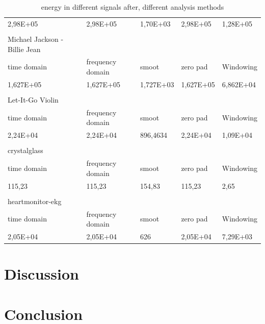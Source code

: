 \begin{table}[]
\begin{tabularx}{\textwidth}{Xllll}
		2,98E+05                      & 2,98E+05         & 1,70E+03  & 2,98E+05  & 1,28E+05  \\
		                              &                  &           &           &           \\
		Michael Jackson - Billie Jean &                  &           &           &           \\
		time domain                   & frequency domain & smoot     & zero pad  & Windowing \\
		1,627E+05                     & 1,627E+05        & 1,727E+03 & 1,627E+05 & 6,862E+04 \\
		                              &                  &           &           &           \\
		Let-It-Go Violin              &                  &           &           &           \\
		time domain                   & frequency domain & smoot     & zero pad  & Windowing \\
		2,24E+04                      & 2,24E+04         & 896,4634  & 2,24E+04  & 1,09E+04  \\
		                              &                  &           &           &           \\
		crystalglass                  &                  &           &           &           \\
		time domain                   & frequency domain & smoot     & zero pad  & Windowing \\
		115,23                        & 115,23           & 154,83    & 115,23    & 2,65      \\
		                              &                  &           &           &           \\
		heartmonitor-ekg              &                  &           &           &           \\
		time domain                   & frequency domain & smoot     & zero pad  & Windowing \\
		2,05E+04                      & 2,05E+04         & 626       & 2,05E+04  & 7,29E+03 
	\end{tabularx}
	
	\caption{energy in different signals after, different analysis methods }
	\label{tab:Energy}
\end{table}

\section{Discussion}

\section{Conclusion}